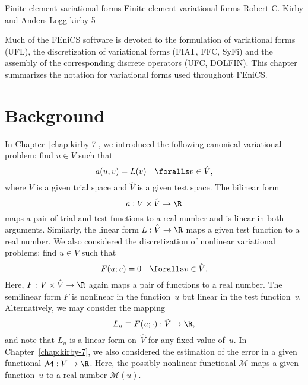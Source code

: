               {Finite element variational forms}
              {Finite element variational forms}
              {Robert C. Kirby and Anders Logg}
              {kirby-5}

Much of the FEniCS software is devoted to the formulation of
variational forms (UFL), the discretization of variational forms
(FIAT, FFC, SyFi) and the assembly of the corresponding discrete
operators (UFC, DOLFIN). This chapter summarizes the notation for
variational forms used throughout FEniCS.

\section{Background}

In Chapter~\ref{chap:kirby-7}, we introduced the following canonical
variational problem: find $u \in V$ such that
\begin{equation} \label{eq:kirby-5:canonical}
  a(u, v) = L(v) \quad \foralls v \in \hat{V},
\end{equation}
where $V$ is a given trial space and $\hat{V}$ is a given test space.
The bilinear form
\begin{equation}
  a: V \times \hat{V} \rightarrow \R
\end{equation}
maps a pair of trial and test functions to a real number and is linear
in both arguments. Similarly, the linear form $L: \hat{V} \rightarrow
\R$ maps a given test function to a real number. We also considered
the discretization of nonlinear variational problems: find $u \in V$
such that
\begin{equation}
  F(u; v) = 0 \quad \foralls v \in \hat{V}.
\end{equation}
Here, $F: V \times \hat{V} \rightarrow \R$ again maps a pair of
functions to a real number. The semilinear form $F$ is nonlinear in
the function~$u$ but linear in the test function~$v$. Alternatively,
we may consider the mapping
\begin{equation}
  L_u \equiv F(u; \cdot) : \hat{V} \rightarrow \R,
\end{equation}
and note that $L_u$ is a linear form on~$\hat{V}$ for any fixed value
of~$u$. In Chapter~\ref{chap:kirby-7}, we also considered the
estimation of the error in a given functional $\mathcal{M} : V
\rightarrow \R$. Here, the possibly nonlinear functional $\mathcal{M}$
maps a given function~$u$ to a real number $\mathcal{M}(u)$.

